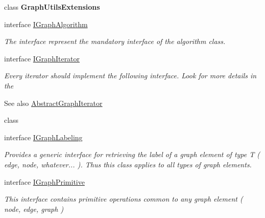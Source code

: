 \begin{DoxyCompactItemize}
class {\bfseries Graph\+Utils\+Extensions}
\item 
interface \hyperlink{interface_graph_library_1_1_generics_1_1_i_graph_algorithm}{I\+Graph\+Algorithm}
\begin{DoxyCompactList}\small\item\em The interface represent the mandatory interface of the algorithm class. \end{DoxyCompactList}\item 
interface \hyperlink{interface_graph_library_1_1_generics_1_1_i_graph_iterator}{I\+Graph\+Iterator}
\begin{DoxyCompactList}\small\item\em Every iterator should implement the following interface. Look for more details in the \begin{DoxySeeAlso}{See also}
\hyperlink{class_graph_library_1_1_generics_1_1_abstract_graph_iterator}{Abstract\+Graph\+Iterator}


\end{DoxySeeAlso}
class \end{DoxyCompactList}\item 
interface \hyperlink{interface_graph_library_1_1_generics_1_1_i_graph_labeling}{I\+Graph\+Labeling}
\begin{DoxyCompactList}\small\item\em Provides a generic interface for retrieving the label of a graph element of type T ( edge, node, whatever... ). Thus this class applies to all types of graph elements. \end{DoxyCompactList}\item 
interface \hyperlink{interface_graph_library_1_1_generics_1_1_i_graph_primitive}{I\+Graph\+Primitive}
\begin{DoxyCompactList}\small\item\em This interface contains primitive operations common to any graph element ( node, edge, graph ) \end{DoxyCompactList}\end{DoxyCompactItemize}
